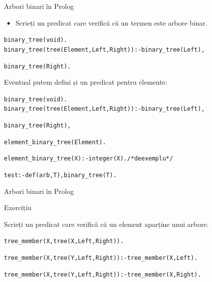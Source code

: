 \documentclass[xcolor=x11names,compress,10pt]{beamer}
\begin{document}
\begin{frame}{Arbori binari în Prolog}
\medskip

\begin{itemize}
\item Scrieți un predicat care verifică că un termen este arbore binar. 
\end{itemize}

\pause\medskip

\begin{alltt}
binary\_tree(void).\\
binary\_tree(tree(Element,Left,Right)) :- binary\_tree(Left),

\hspace*{7cm} binary\_tree(Right).
\end{alltt}

\pause
Eventual putem defini și un predicat pentru elemente:

\begin{alltt}
binary\_tree(void).\\
binary\_tree(tree(Element,Left,Right)) :-  binary\_tree(Left), 

\hspace*{6.5cm} binary\_tree(Right), 

\hspace*{6.5cm} element\_binary\_tree(Element).

element\_binary\_tree(X):- integer(X). /* de exemplu */\\

\pause

test:- def(arb,T), binary\_tree(T). 

\end{alltt}
\end{frame}

\begin{frame}{Arbori binari în Prolog}
\begin{block}{Exercițiu}

Scrieți un predicat  care verifică că un element aparține unui arbore.
\medskip

\begin{alltt}
tree\_member(X,tree(X,Left,Right)).

\medskip

	tree\_member(X,tree(Y,Left,Right)) :- tree\_member(X,Left).
	
	\medskip
	
	tree\_member(X,tree(Y,Left,Right)) :- tree\_member(X,Right).
\end{alltt}
\end{block}
\end{frame}
\end{document}
